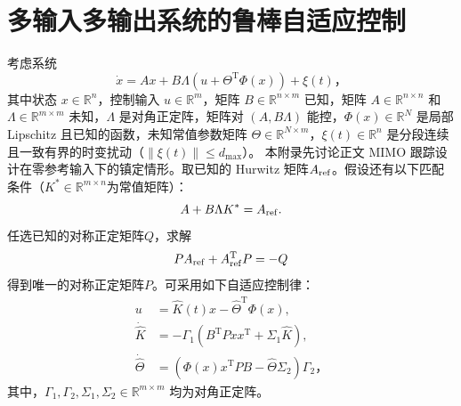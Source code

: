 \chapter{多输入多输出系统的鲁棒自适应控制} \label{MIMO_robust}


考虑系统
\begin{equation} \label{MIMO_sys_disturbance}
    \dot{x} = A x + B \Lambda (u + \Theta^\mathrm{T} \Phi(x)) + \xi(t) \text{，}
\end{equation}
其中状态 $x \in \mathbb{R}^n$，控制输入 $u \in \mathbb{R}^m$，矩阵 $B \in \mathbb{R}^{n \times m}$ 已知，矩阵 $A \in \mathbb{R}^{n \times n}$ 和 $\Lambda \in \mathbb{R}^{m \times m}$ 未知，$\Lambda$ 是对角正定阵，矩阵对 $(A, B \Lambda)$ 能控，$\Phi(x) \in \mathbb{R}^N$ 是局部 Lipschitz 且已知的函数，未知常值参数矩阵 $\Theta \in \mathbb{R}^{N \times m}$，$\xi(t) \in \mathbb{R}^n$ 是分段连续且一致有界的时变扰动（$\| \xi(t) \| \leq d_{\mathrm{max}}$）。
本附录先讨论正文 MIMO 跟踪设计在零参考输入下的镇定情形。取已知的 Hurwitz 矩阵$A_{\operatorname{ref}}$。假设还有以下匹配条件（$K^*\in\mathbb{R}^{m\times n}$为常值矩阵）：
\[
    A+B\Lambda K^*=A_{\operatorname{ref}}.
\]
任选已知的对称正定矩阵$Q$，求解
\[
    PA_{\operatorname{ref}}+A_{\operatorname{ref}}^{\mathrm{T}}P=-Q
\]
得到唯一的对称正定矩阵$P$。可采用如下自适应控制律：
\begin{align*}
    u &= \hat{K}(t)x - \hat{\Theta}^\mathrm{T}\Phi(x), \\
    \dot{\hat{K}} &= - \Gamma_1 (B^\mathrm{T} P x x^\mathrm{T} + \Sigma_1\hat{K}), \\
    \dot{\hat{\Theta}} &= (\Phi(x)x^\mathrm{T} P B - \hat{\Theta}\Sigma_2)\Gamma_2 \text{，}
\end{align*}
其中，$\Gamma_1, \Gamma_2, \Sigma_1, \Sigma_2\in\mathbb{R}^{m\times m}$ 均为对角正定阵。

